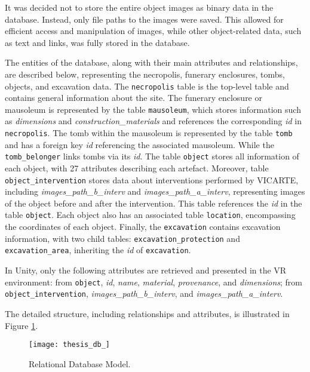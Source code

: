 It was decided not to store the entire object images as binary data in the database. Instead, only file paths to the images were saved. This allowed for efficient access and manipulation of images, while other object-related data, such as text and links, was fully stored in the database.

The entities of the database, along with their main attributes and relationships, are described below, representing the necropolis, funerary enclosures, tombs, objects, and excavation data.
The \texttt{necropolis} table is the top-level table and contains general information about the site.  
The funerary enclosure or mausoleum is represented by the table \texttt{mausoleum}, which stores information such as \emph{dimensions} and \emph{construction\_materials} and references the corresponding \emph{id} in \texttt{necropolis}. The tomb within the mausoleum is represented by the table \texttt{tomb} and has a foreign key \emph{id} referencing the associated mausoleum.  
While the \texttt{tomb\_belonger} links tombs via its \emph{id}. The table \texttt{object} stores all information of each object, with 27 attributes describing each artefact. 
Moreover, table \texttt{object\_intervention} stores data about interventions performed by \gls{VICARTE}, including \emph{images\_path\_b\_interv} and \emph{images\_path\_a\_interv}, representing images of the object before and after the intervention. This table references the \emph{id} in the table \texttt{object}. Each object also has an associated table \texttt{location}, encompassing the coordinates of each object.  
Finally, the \texttt{excavation} contains excavation information, with two child tables: \texttt{excavation\_protection} and \texttt{excavation\_area}, inheriting the \emph{id} of \texttt{excavation}.  

In Unity, only the following attributes are retrieved and presented in the \gls{VR} environment: from \texttt{object}, \emph{id}, \emph{name}, \emph{material}, \emph{provenance}, and \emph{dimensions}; from \texttt{object\_intervention}, \emph{images\_path\_b\_interv}, and \emph{images\_path\_a\_interv}.

The detailed structure, including relationships and attributes, is illustrated in Figure \ref{fig:database}.

\begin{figure}[h!]
    \centering
    \texttt{[image: thesis\_db\_]}
    \caption{Relational Database Model.} 
    \label{fig:database}
\end{figure}


